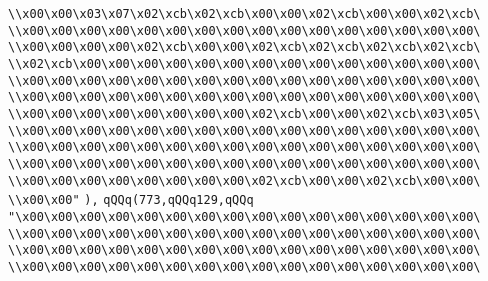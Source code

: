 \verb|\\x00\x00\x03\x07\x02\xcb\x02\xcb\x00\x00\x02\xcb\x00\x00\x02\xcb\|\newline
\verb|\\x00\x00\x00\x00\x00\x00\x00\x00\x00\x00\x00\x00\x00\x00\x00\x00\|\newline
\verb|\\x00\x00\x00\x00\x02\xcb\x00\x00\x02\xcb\x02\xcb\x02\xcb\x02\xcb\|\newline
\verb|\\x02\xcb\x00\x00\x00\x00\x00\x00\x00\x00\x00\x00\x00\x00\x00\x00\|\newline
\verb|\\x00\x00\x00\x00\x00\x00\x00\x00\x00\x00\x00\x00\x00\x00\x00\x00\|\newline
\verb|\\x00\x00\x00\x00\x00\x00\x00\x00\x00\x00\x00\x00\x00\x00\x00\x00\|\newline
\verb|\\x00\x00\x00\x00\x00\x00\x00\x00\x02\xcb\x00\x00\x02\xcb\x03\x05\|\newline
\verb|\\x00\x00\x00\x00\x00\x00\x00\x00\x00\x00\x00\x00\x00\x00\x00\x00\|\newline
\verb|\\x00\x00\x00\x00\x00\x00\x00\x00\x00\x00\x00\x00\x00\x00\x00\x00\|\newline
\verb|\\x00\x00\x00\x00\x00\x00\x00\x00\x00\x00\x00\x00\x00\x00\x00\x00\|\newline
\verb|\\x00\x00\x00\x00\x00\x00\x00\x00\x02\xcb\x00\x00\x02\xcb\x00\x00\|\newline
\verb|\\x00\x00"|\newline
\verb|),|\newline
\verb|qQQq(773,qQQq129,qQQq|\newline
\verb|"\x00\x00\x00\x00\x00\x00\x00\x00\x00\x00\x00\x00\x00\x00\x00\x00\|\newline
\verb|\\x00\x00\x00\x00\x00\x00\x00\x00\x00\x00\x00\x00\x00\x00\x00\x00\|\newline
\verb|\\x00\x00\x00\x00\x00\x00\x00\x00\x00\x00\x00\x00\x00\x00\x00\x00\|\newline
\verb|\\x00\x00\x00\x00\x00\x00\x00\x00\x00\x00\x00\x00\x00\x00\x00\x00\|\newline
